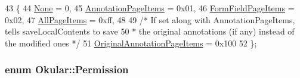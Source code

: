 \begin{DoxyCode}
43 \{
44     \hyperlink{namespaceOkular_ad8955fd515cc3f63a14cdff6723e6c1ba6969c0e2e87cc779dae8be495740eda6}{None} = 0,
45     \hyperlink{namespaceOkular_ad8955fd515cc3f63a14cdff6723e6c1bae381057ad4a79c350a0d4a9aaaaa995b}{AnnotationPageItems} = 0x01,
46     \hyperlink{namespaceOkular_ad8955fd515cc3f63a14cdff6723e6c1bac7554622ca47fc955ea25889b6637d3b}{FormFieldPageItems} = 0x02,
47     \hyperlink{namespaceOkular_ad8955fd515cc3f63a14cdff6723e6c1bad157628664d884c59d2cc11bcdddb76a}{AllPageItems} = 0xff,
48 
49     \textcolor{comment}{/* If set along with AnnotationPageItems, tells saveLocalContents to save}
50 \textcolor{comment}{     * the original annotations (if any) instead of the modified ones */}
51     \hyperlink{namespaceOkular_ad8955fd515cc3f63a14cdff6723e6c1ba1feb4fde97e57698f97d64a2a3b824bb}{OriginalAnnotationPageItems} = 0x100
52 \};
\end{DoxyCode}
\hypertarget{namespaceOkular_a3601f4e702453ddf1125476dd6e7577b}{
\subsubsection[{Permission}]{\setlength{\rightskip}{0pt plus 5cm}enum {\bf Okular\+::\+Permission}}}\label{namespaceOkular_a3601f4e702453ddf1125476dd6e7577b}
